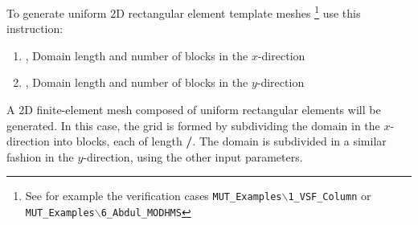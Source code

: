 To generate uniform 2D rectangular element template meshes \footnote{See for example the verification cases \texttt{MUT\_Examples$\backslash$1\_VSF\_Column} or \texttt{MUT\_Examples$\backslash$6\_Abdul\_MODHMS}} use this instruction:

    {
    \squish
    \begin{enumerate}
    \item {},   Domain length and number of blocks in the $x$-direction
    \item {},   Domain length and number of blocks in the $y$-direction
    \end{enumerate}
    A 2D finite-element mesh composed of uniform rectangular elements will be generated. In this case, the
    grid is formed by subdividing the domain in the $x$-direction into  blocks, each of length
    \textbf{/}. The domain is subdivided in a similar fashion in the $y$-direction, using the other input parameters.
    }

%
%


